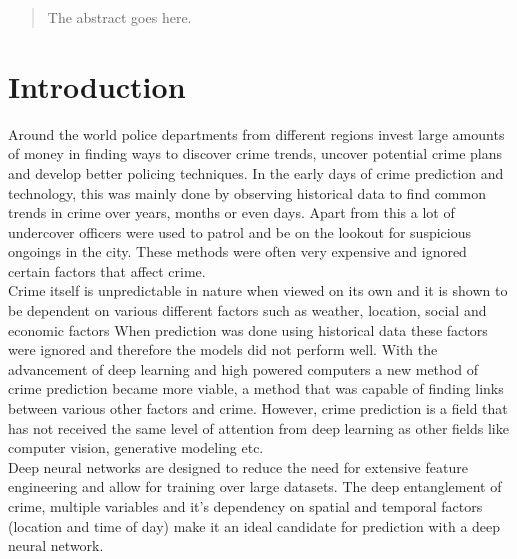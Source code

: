 \documentclass[conference]{IEEEtran}
\begin{document}
\begin{abstract}
The abstract goes here.
\end{abstract}



%
\IEEEpeerreviewmaketitle


\section{Introduction}

Around the world police departments from different regions invest large amounts
of money in finding ways to discover crime trends, uncover potential crime plans and
develop better policing techniques. In the early days of crime prediction and technology,
this was mainly done by observing historical data to find common trends in crime over years,
months or even days. Apart from this a lot of undercover officers were used to patrol and be on
the lookout for suspicious ongoings in the city. These methods were often very expensive and ignored
certain factors that affect crime.\\

Crime itself is unpredictable in nature when viewed on its own and it is shown to be dependent
on various different factors such as weather, location, social and economic factors \cite{Carlen}
When prediction was done using historical data these factors were ignored and therefore the models
did not perform well. With the advancement of deep learning and high powered computers a new method of
crime prediction became more viable, a method that was capable of finding links between various other factors and crime.
However, crime prediction is a field that has not received the same level of attention from deep learning as other fields
like computer vision, generative modeling etc.\\

Deep neural networks are designed to reduce the need for extensive feature engineering and allow for training over large datasets.
The deep entanglement of crime, multiple variables and it's dependency on spatial and temporal factors (location and time of day)
make it an ideal candidate for prediction with a deep neural network.
\end{document}

